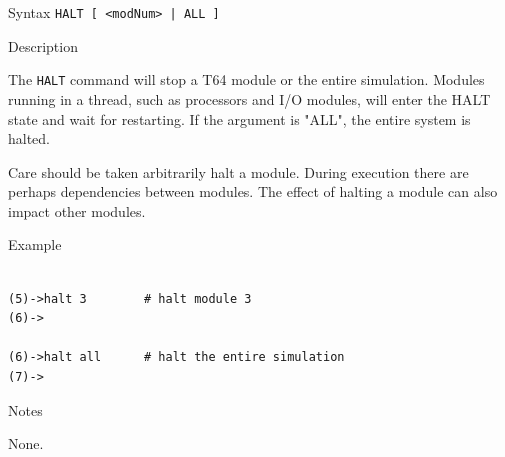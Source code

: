 %
%
\pagebreak
{}

\begin{iPageDescEntry}{Syntax}
\texttt{HALT [ <modNum> | ALL ]} \\
\end{iPageDescEntry}

\begin{iPageDescEntry}{Description}

The \texttt{HALT} command will stop a T64 module or the entire simulation. Modules running in a thread, such as processors and I/O modules, will enter the HALT state and wait for restarting. If the argument is "ALL", the entire system is halted.

Care should be taken arbitrarily halt a module. During execution there are perhaps dependencies between modules. The effect of halting a module can also impact other modules. 

\end{iPageDescEntry}

\begin{iPageDescOpEntry}{Example}
\begin{lstlisting}[style=iPageOpStyle]

(5)->halt 3        # halt module 3
(6)->

(6)->halt all      # halt the entire simulation
(7)->

\end{lstlisting}
\end{iPageDescOpEntry}

\begin{iPageDescEntry}{Notes}

None.

\end{iPageDescEntry}
